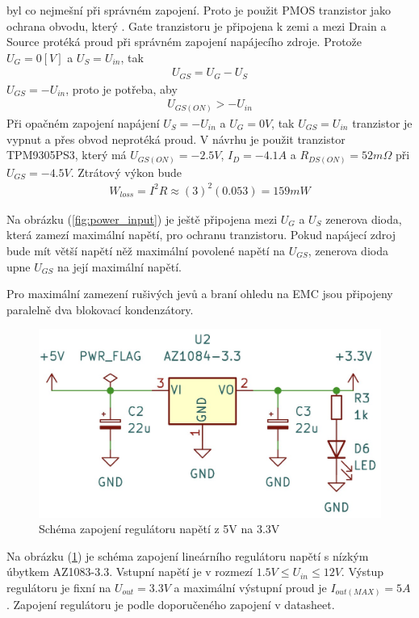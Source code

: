 byl co nejmešní při správném zapojení. Proto je použit PMOS tranzistor jako ochrana obvodu, který . Gate tranzistoru je připojena k zemi a mezi Drain a Source protéká proud při správném zapojení napájecího zdroje. Protože $ U_G = 0 [V]$ a $U_S = U_{in}$, tak
\begin{align*}
    U_{GS} = U_G - U_S
\end{align*}
$U_{GS} = -U_{in} $, proto je potřeba, aby
\begin{align*}
    U_{GS(ON)} > -U_{in}
\end{align*}
Při opačném zapojení napájení $U_S = -U_{in}$ a $ U_G = 0 V$, tak  $U_{GS} = U_{in}$ tranzistor je vypnut a přes obvod neprotéká proud.
V návrhu je použit tranzistor TPM9305PS3, který má  $U_{GS(ON)} = -2.5V $,  $I_D = -4.1A$ a $R_{DS(ON)} = 52m \Omega$ při $U_{GS} = -4.5V$.
Ztrátový výkon bude
\begin{align*}
    W_{loss} = I^2 R \approx (3)^2 (0.053) =  159 mW
\end{align*}

Na obrázku (\ref{fig:power_input}) je ještě připojena mezi $U_G$ a $U_S$ zenerova dioda, která zamezí maximální napětí, pro ochranu tranzistoru. Pokud napájecí zdroj bude mít větší napětí něž maximální povolené napětí na $U_{GS}$, zenerova dioda upne $U_{GS}$ na její maximální napětí.
\par
Pro maximální zamezení rušivých jevů a braní ohledu na EMC jsou připojeny paralelně dva blokovací kondenzátory.

\begin{figure}[H]
    \includegraphics[width=0.9\linewidth]{pictures/ldo_3v3.jpg}
    \caption{Schéma zapojení regulátoru napětí z 5V na 3.3V}
    \label{fig:stepdown}
\end{figure}
Na obrázku (\ref{fig:stepdown}) je schéma zapojení lineárního regulátoru napětí s nízkým úbytkem AZ1083-3.3. Vstupní napětí je v rozmezí $1.5V \leq U_{in} \leq 12V $. Výstup regulátoru je fixní na $U_{out} = 3.3V$ a maximální výstupní proud je $I_{out(MAX)} = 5A$. Zapojení regulátoru je podle doporučeného zapojení v datasheet.


